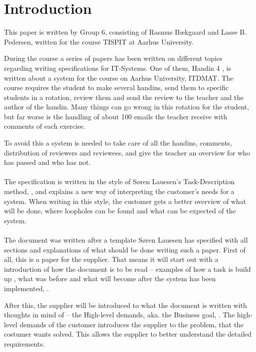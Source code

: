 \documentclass[Main]{subfiles}
\begin{document}
\section{Introduction}


This paper is written by Group 6, consisting of Rasmus Bækgaard and Lasse B. Pedersen, written for the course TISPIT at Aarhus University.


During the course a series of papers has been written on different topics regarding writing specifications for IT-Systems.
One of them, Handin 4 \parencite{HI4}, is written about a system for the course on Aarhus University, ITDMAT. 
The course requires the student to make several handins, send them to specific students in a rotation, review them and send the review to the teacher and the author of the handin.
Many things can go wrong in this rotation for the student, but far worse is the handling of about 100 emails the teacher receive with comments of each exercise.

To avoid this a system is needed to take care of all the handins, comments, distribution of reviewers and reviewees, and give the teacher an overview for who has passed and who has not.
\\
\\
The specification is written in the style of Søren Lauesen's Task-Description method, \parencite{Task}, and explains a new way of interpreting the customer's needs for a system.
When writing in this style, the customer gets a better overview of what will be done, where loopholes can be found and what can be expected of the system.
\\
\\
The document was written after a template Søren Lauesen has specified with all sections and explanations of what should be done writing such a paper.
First of all, this is a paper for the supplier.
That means it will start out with a introduction of how the document is to be read -- examples of how a task is build up \parencite[5-6]{HI4}, what was before and what will become after the system has been implemented, \parencite[4]{HI4}.

After this, the supplier will be introduced to what the document is written with thoughts in mind of -- the High-level demands, aka. the Business goal, \parencite[7]{HI4}. 
The high-level demands of the customer introduces the supplier to the problem, that the costumer wants solved. This allows the supplier to better understand the detailed requirements.
\end{document}

